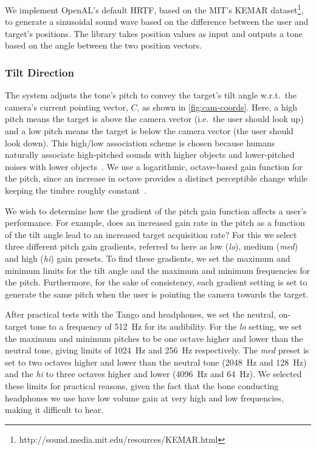 \documentclass[sigconf, review=true, screen=true, anonymous=true]{acmart}
\begin{document}
We implement OpenAL's default HRTF, based on the MIT's KEMAR dataset\footnote{http://sound.media.mit.edu/resources/KEMAR.html}, to generate a sinusoidal sound wave based on the difference between the user and target's positions.
The library takes position values as input and outputs a tone based on the angle between the two position vectors. 

\subsubsection{Tilt Direction}

The system adjusts the tone's pitch to convey the target's tilt angle w.r.t.\ the camera's current pointing vector, $C$, as shown in \cref{fig:cam-coords}. 
Here, a high pitch means the target is above the camera vector (i.e.\ the user should look up) and a low pitch means the target is below the camera vector (the user should look down).
This high/low association scheme is chosen because humans naturally associate high-pitched sounds with higher objects and lower-pitched noises with lower objects~\cite{pratt1930spatial, blauert1997spatial}.
We use a logarithmic, octave-based gain function for the pitch, since an increase in octave provides a distinct perceptible change while keeping the timbre roughly constant~\cite{shepard1964circularity}.

We wish to determine how the gradient of the pitch gain function affects a user's performance.
For example, does an increased gain rate in the pitch as a function of the tilt angle lead to an increased target acquisition rate? For this we select three different pitch gain gradients, referred to here as low (\emph{lo}), medium (\emph{med}) and high (\emph{hi}) gain presets.
To find these gradients, we set the maximum and minimum limits for the tilt angle and the maximum and minimum frequencies for the pitch.
Furthermore, for the sake of consistency, each gradient setting is set to generate the same pitch when the user is pointing the camera towards the target. 

After practical tests with the Tango and headphones, we set the neutral, on-target tone to a frequency of \SI{512}{\hertz} for its audibility.
For the \emph{lo} setting, we set the maximum and minimum pitches to be one octave higher and lower than the neutral tone, giving limits of \SI{1024}{\hertz} and \SI{256}{\hertz} respectively.
The \emph{med} preset is set to two octaves higher and lower than the neutral tone (\SI{2048}{\hertz} and \SI{128}{\hertz}) and the \emph{hi} to three octaves higher and lower (\SI{4096}{\hertz} and \SI{64}{\hertz}).
We selected these limits for practical reasons, given the fact that the bone conducting headphones we use have low volume gain at very high and low frequencies, making it difficult to hear. 
\end{document}
